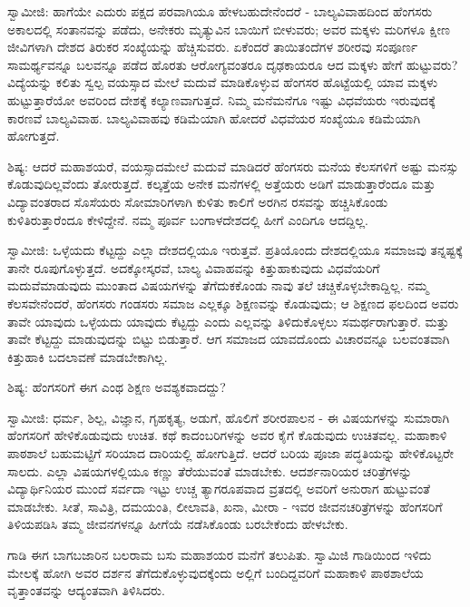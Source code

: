 ಸ್ವಾಮೀಜಿ: ಹಾಗೆಯೇ ಎದುರು ಪಕ್ಷದ ಪರವಾಗಿಯೂ ಹೇಳಬಹುದೇನೆಂದರೆ - ಬಾಲ್ಯವಿವಾಹದಿಂದ ಹೆಂಗಸರು ಅಕಾಲದಲ್ಲಿ ಸಂತಾನವನ್ನು ಪಡೆದು, ಅನೇಕರು ಮೃತ್ಯುವಿನ ಬಾಯಿಗೆ ಬೀಳುವರು; ಅವರ ಮಕ್ಕಳು ಮರಿಗಳೂ ಕ್ಷೀಣ ಜೀವಿಗಳಾಗಿ ದೇಶದ ತಿರುಕರ ಸಂಖ್ಯೆಯನ್ನು ಹೆಚ್ಚಿಸುವರು. ಏಕೆಂದರೆ ತಾಯಿತಂದೆಗಳ ಶರೀರವು ಸಂಪೂರ್ಣ ಸಾಮರ್ಥ್ಯವನ್ನೂ ಬಲವನ್ನೂ ಪಡೆದ ಹೊರತು ಆರೋಗ್ಯವಂತರೂ ದೃಢಕಾಯರೂ ಆದ ಮಕ್ಕಳು ಹೇಗೆ ಹುಟ್ಟುವರು? ವಿದ್ಯೆಯನ್ನು ಕಲಿತು ಸ್ವಲ್ಪ ವಯಸ್ಸಾದ ಮೇಲೆ ಮದುವೆ ಮಾಡಿಕೊಳ್ಳುವ ಹೆಂಗಸರ ಹೊಟ್ಟೆಯಲ್ಲಿ ಯಾವ ಮಕ್ಕಳು ಹುಟ್ಟುತ್ತಾರೆಯೋ ಅವರಿಂದ ದೇಶಕ್ಕೆ ಕಲ್ಯಾಣವಾಗುತ್ತದೆ. ನಿಮ್ಮ ಮನೆಮನೆಗೂ ಇಷ್ಟು ವಿಧವೆಯರು ಇರುವುದಕ್ಕೆ ಕಾರಣವೆ ಬಾಲ್ಯವಿವಾಹ. ಬಾಲ್ಯವಿವಾಹವು ಕಡಿಮೆಯಾಗಿ ಹೋದರೆ ವಿಧವೆಯರ ಸಂಖ್ಯೆಯೂ ಕಡಿಮೆಯಾಗಿ ಹೋಗುತ್ತದೆ.

ಶಿಷ್ಯ: ಆದರೆ ಮಹಾಶಯರೆ, ವಯಸ್ಸಾದಮೇಲೆ ಮದುವೆ ಮಾಡಿದರೆ ಹೆಂಗಸರು ಮನೆಯ ಕೆಲಸಗಳಿಗೆ ಅಷ್ಟು ಮನಸ್ಸು ಕೊಡುವುದಿಲ್ಲವೆಂದು ತೋರುತ್ತದೆ. ಕಲ್ಕತ್ತೆಯ ಅನೇಕ ಮನೆಗಳಲ್ಲಿ ಅತ್ತೆಯರು ಅಡಿಗೆ ಮಾಡುತ್ತಾರೆಂದೂ ಮತ್ತು ವಿದ್ಯಾವಂತರಾದ ಸೊಸೆಯರು ಸೋಮಾರಿಗಳಾಗಿ ಕುಳಿತು ಕಾಲಿಗೆ ಅರಗಿನ ರಸವನ್ನು ಹಚ್ಚಿಸಿಕೊಂಡು ಕುಳಿತಿರುತ್ತಾರೆಂದೂ ಕೇಳಿದ್ದೇನೆ. ನಮ್ಮ ಪೂರ್ವ ಬಂಗಾಳದೇಶದಲ್ಲಿ ಹೀಗೆ ಎಂದಿಗೂ ಆದದ್ದಿಲ್ಲ.

ಸ್ವಾಮೀಜಿ: ಒಳ್ಳೆಯದು ಕೆಟ್ಟದ್ದು ಎಲ್ಲಾ ದೇಶದಲ್ಲಿಯೂ ಇರುತ್ತವೆ. ಪ್ರತಿಯೊಂದು ದೇಶದಲ್ಲಿಯೂ ಸಮಾಜವು ತನ್ನಷ್ಟಕ್ಕೆ ತಾನೇ ರೂಪುಗೊಳ್ಳುತ್ತದೆ. ಅದಕ್ಕೋಸ್ಕರವೆ, ಬಾಲ್ಯ ವಿವಾಹವನ್ನು ಕಿತ್ತುಹಾಕುವುದು ವಿಧವೆಯರಿಗೆ ಮದುವೆಮಾಡುವುದು ಮುಂತಾದ ವಿಷಯಗಳನ್ನು ತೆಗೆದುಕಕೊಂಡು ನಾವು ತಲೆ ಚಚ್ಚಿಕೊಳ್ಳಬೇಕಾದ್ದಿಲ್ಲ. ನಮ್ಮ ಕೆಲಸವೇನೆಂದರೆ, ಹೆಂಗಸರು ಗಂಡಸರು ಸಮಾಜ ಎಲ್ಲಕ್ಕೂ ಶಿಕ್ಷಣವನ್ನು ಕೊಡುವುದು; ಆ ಶಿಕ್ಷಣದ ಫಲದಿಂದ ಅವರು ತಾವೇ ಯಾವುದು ಒಳ್ಳೆಯದು ಯಾವುದು ಕೆಟ್ಟದ್ದು ಎಂದು ಎಲ್ಲವನ್ನು ತಿಳಿದುಕೊಳ್ಳಲು ಸಮರ್ಥರಾಗುತ್ತಾರೆ. ಮತ್ತು ತಾವೇ ಕೆಟ್ಟದ್ದು ಮಾಡುವುದನ್ನು ಬಿಟ್ಟು ಬಿಡುತ್ತಾರೆ. ಆಗ ಸಮಾಜದ ಯಾವದೊಂದು ವಿಚಾರವನ್ನೂ ಬಲವಂತವಾಗಿ ಕಿತ್ತುಹಾಕಿ ಬದಲಾವಣೆ ಮಾಡಬೇಕಾಗಿಲ್ಲ.

ಶಿಷ್ಯ: ಹೆಂಗಸರಿಗೆ ಈಗ ಎಂಥ ಶಿಕ್ಷಣ ಅವಶ್ಯಕವಾದದ್ದು?

ಸ್ವಾಮೀಜಿ: ಧರ್ಮ, ಶಿಲ್ಪ, ವಿಜ್ಞಾನ, ಗೃಹಕೃತ್ಯ, ಅಡುಗೆ, ಹೊಲಿಗೆ ಶರೀರಪಾಲನ - ಈ ವಿಷಯಗಳನ್ನು ಸುಮಾರಾಗಿ ಹೆಂಗಸರಿಗೆ ಹೇಳಿಕೊಡುವುದು ಉಚಿತ. ಕಥೆ ಕಾದಂಬರಿಗಳನ್ನು ಅವರ ಕೈಗೆ ಕೊಡುವುದು ಉಚಿತವಲ್ಲ. ಮಹಾಕಾಳಿ ಪಾಠಶಾಲೆ ಬಹುಮಟ್ಟಿಗೆ ಸರಿಯಾದ ದಾರಿಯಲ್ಲಿ ಹೋಗುತ್ತಿದೆ. ಆದರೆ ಬರಿಯ ಪೂಜಾ ಪದ್ಧತಿಯನ್ನು ಹೇಳಿಕೊಟ್ಟರೇ ಸಾಲದು. ಎಲ್ಲಾ ವಿಷಯಗಳಲ್ಲಿಯೂ ಕಣ್ಣು ತೆರೆಯುವಂತೆ ಮಾಡಬೇಕು. ಆದರ್ಶನಾರಿಯರ ಚರಿತ್ರೆಗಳನ್ನು ವಿದ್ಯಾರ್ಥಿನಿಯರ ಮುಂದೆ ಸರ್ವದಾ ಇಟ್ಟು ಉಚ್ಚ ತ್ಯಾಗರೂಪವಾದ ವ್ರತದಲ್ಲಿ ಅವರಿಗೆ ಅನುರಾಗ ಹುಟ್ಟುವಂತೆ ಮಾಡಬೇಕು. ಸೀತೆ, ಸಾವಿತ್ರಿ, ದಮಯಂತಿ, ಲೀಲಾವತಿ, ಖನಾ, ಮೀರಾ - ಇವರ ಜೀವನಚರಿತ್ರೆಗಳನ್ನು ಹೆಂಗಸರಿಗೆ ತಿಳಿಯಪಡಿಸಿ ತಮ್ಮ ಜೀವನಗಳನ್ನೂ ಹೀಗೆಯೆ ನಡೆಸಿಕೊಂಡು ಬರಬೇಕೆಂದು ಹೇಳಬೇಕು.

ಗಾಡಿ ಈಗ ಬಾಗಬಜಾರಿನ ಬಲರಾಮ ಬಸು ಮಹಾಶಯರ ಮನೆಗೆ ತಲುಪಿತು. ಸ್ವಾಮಿಜಿ ಗಾಡಿಯಿಂದ ಇಳಿದು ಮೇಲಕ್ಕೆ ಹೋಗಿ ಅವರ ದರ್ಶನ ತೆಗೆದುಕೊಳ್ಳುವುದಕ್ಕೆಂದು ಅಲ್ಲಿಗೆ ಬಂದಿದ್ದವರಿಗೆ ಮಹಾಕಾಳಿ ಪಾಠಶಾಲೆಯ ವೃತ್ತಾಂತವನ್ನು ಆದ್ಯಂತವಾಗಿ ತಿಳಿಸಿದರು.

